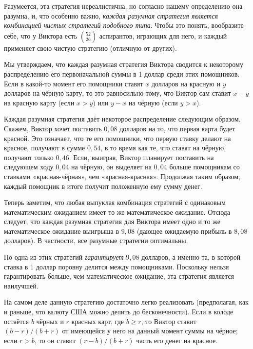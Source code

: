 \documentclass[twoside]{book}
\begin{document}
Разумеется, эта стратегия нереалистична, но согласно нашему определению она разумна, и, что особенно важно, \emph{каждая разумная стратегия является комбинацией чистых стратегий подобного типа}.
Чтобы это понять, вообразите себе, что у Виктора есть $\binom{52}{26}$ аспирантов, играющих для него, и каждый применяет свою чистую стратегию (отличную от других).

Мы утверждаем, что каждая разумная стратегия Виктора сводится к некоторому распределению  его первоначальной суммы в 1 доллар среди этих помощников.
Если в какой-то момент его помощники ставят $x$ долларов на красную и $y$ долларов на чёрную карту, то это равносильно тому, что Виктор сам ставит $x-y$ на красную карту (если $x > y$) или $y-x$ на чёрную (если $y>x$).

Каждая разумная стратегия даёт некоторое распределение следующим образом.
Скажем, Виктор хочет поставить $0{,}08$ долларов на то, что первая карта будет красной.
Это означает, что те его помощники, что первую ставку делают на
красное, получают в сумме $0{,}54$, в то время как те, что ставят на чёрную, получают только $0{,}46$.
Если, выиграв, Виктор планирует поставить на следующем ходу $0{,}04$ на чёрную, он выделяет на $0{,}04$ больше помощникам со ставками «красная-чёрная», чем «красная-красная».
Продолжая таким образом, каждый помощник в итоге получит положенную ему сумму денег.

Теперь заметим, что любая выпуклая комбинация стратегий с одинаковым
математическим ожиданием имеет то же математическое ожидание.
Отсюда следует, что каждая разумная стратегия для Виктора имеет одно и
то же математическое ожидание выигрыша в $9{,}08$ (дающее ожидаемую прибыль в $8{,}08$ долларов).
В частности, все разумные стратегии оптимальны.

Но одна из этих стратегий \emph{гарантирует} $9{,}08$ долларов, а именно та, в которой ставка в 1 доллар поровну делится между помощниками.
Поскольку нельзя гарантировать больше, чем математическое ожидание, эта стратегия является наилучшей.\heart

\medskip

На самом деле данную стратегию достаточно легко реализовать (предполагая, как и раньше, что валюту США можно делить до бесконечности).
Если в колоде остаётся $b$ чёрных и $r$ красных карт, где $b\ge r$, то Виктор ставит $(b - r)/(b + r)$ от имеющейся у него на данный момент суммы на чёрное; если $r > b$, то он ставит $(r - b)/(b + r)$ часть его денег на красное.

\medskip
\end{document}
